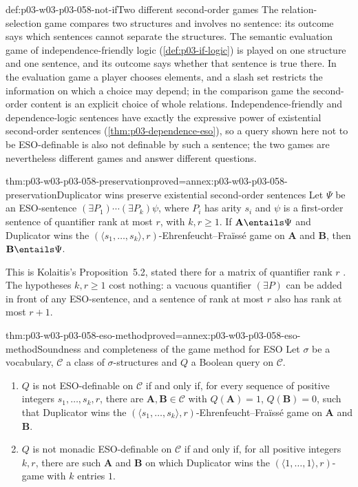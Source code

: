 \begin{hbwarning}{def:p03-w03-p03-058-not-if}{Two different second-order games}
The relation-selection game compares two structures and involves no
sentence: its outcome says which sentences cannot separate the structures.
The semantic evaluation game of independence-friendly logic
(\cref{def:p03-if-logic}) is played on one structure and one sentence, and
its outcome says whether that sentence is true there. In the evaluation
game a player chooses elements, and a slash set restricts the information on
which a choice may depend; in the comparison game the second-order content
is an explicit choice of whole relations. Independence-friendly and
dependence-logic sentences have exactly the expressive power of
existential second-order sentences (\cref{thm:p03-dependence-eso}), so a
query shown here not to be ESO-definable is also not definable by such a
sentence; the two games are nevertheless different games and answer
different questions.
\end{hbwarning}

\begin{hbtheorem}{thm:p03-w03-p03-058-preservation}{proved=annex:p03-w03-p03-058-preservation}{Duplicator wins preserve existential second-order sentences}
Let \(\Psi\) be an ESO-sentence \((\exists P_1)\cdots(\exists P_k)\psi\),
where \(P_i\) has arity \(s_i\) and \(\psi\) is a first-order sentence of
quantifier rank at most \(r\), with \(k,r\ge1\). If
\(\mathbf A\entails\Psi\) and Duplicator wins the
\((\langle s_1,\ldots,s_k\rangle,r)\)-Ehrenfeucht--Fra\"iss\'e game on
\(\mathbf A\) and \(\mathbf B\), then \(\mathbf B\entails\Psi\).
\end{hbtheorem}

This is Kolaitis's Proposition~5.2, stated there for a matrix of quantifier
rank \(r\) \cite[p.~26]{Kolaitis2003ExpressivePowerNotes}. The hypotheses
\(k,r\ge1\) cost nothing: a vacuous quantifier \((\exists P)\) can be added
in front of any ESO-sentence, and a sentence of rank at most \(r\) also
has rank at most \(r+1\).

\begin{hbtheorem}{thm:p03-w03-p03-058-eso-method}{proved=annex:p03-w03-p03-058-eso-method}{Soundness and completeness of the game method for ESO}
Let \(\sigma\) be a vocabulary, \(\mathcal C\) a class of
\(\sigma\)-structures and \(Q\) a Boolean query on \(\mathcal C\).
\begin{enumerate}
\item \(Q\) is not ESO-definable on \(\mathcal C\) if and only if, for every
      sequence of positive integers \(s_1,\ldots,s_k,r\), there are
      \(\mathbf A,\mathbf B\in\mathcal C\) with \(Q(\mathbf A)=1\),
      \(Q(\mathbf B)=0\), such that Duplicator wins the
      \((\langle s_1,\ldots,s_k\rangle,r)\)-Ehrenfeucht--Fra\"iss\'e game on
      \(\mathbf A\) and \(\mathbf B\).
\item \(Q\) is not monadic ESO-definable on \(\mathcal C\) if and only if,
      for all positive integers \(k,r\), there are such \(\mathbf A\) and
      \(\mathbf B\) on which Duplicator wins the
      \((\langle1,\ldots,1\rangle,r)\)-game with \(k\) entries \(1\).
\end{enumerate}
\end{hbtheorem}

